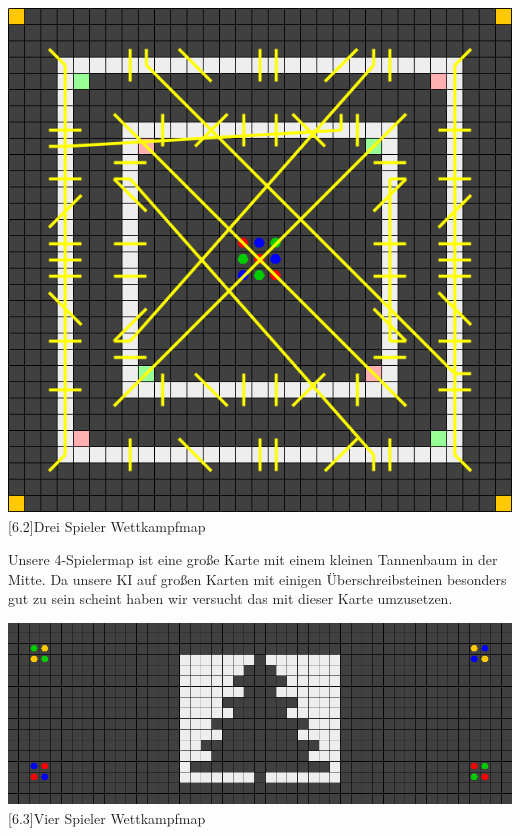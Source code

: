 \documentclass[12pt,a4paper,bibliography=totocnumbered,listof=totocnumbered]{scrartcl}
\begin{document}
	\vspace{1em}
	\begin{minipage}{\linewidth}
		\centering
		\includegraphics[width=0.66\linewidth]{pics/Kapitel_6/DreiSpielerKreise.png}
		[6.2]{Drei Spieler Wettkampfmap}
		\label{fig:6.2}
	\end{minipage}
	\vspace{1em}
	
	Unsere 4-Spielermap ist eine große Karte mit einem kleinen Tannenbaum in der Mitte. Da unsere KI auf großen Karten mit einigen Überschreibsteinen besonders gut zu sein scheint haben wir versucht das mit dieser Karte umzusetzen.
	
	\vspace{1em}
	\begin{minipage}{\linewidth}
		\centering
		\includegraphics[width=0.66\linewidth]{pics/Kapitel_6/TannenbaumMap.PNG}
		[6.3]{Vier Spieler Wettkampfmap}
		\label{fig:6.3}
	\end{minipage}
	\vspace{1em}
	
\end{document}
